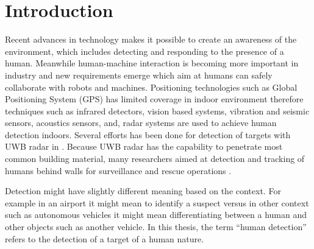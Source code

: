 \chapter{Introduction}
\label{Introduction}
Recent advances in technology makes it possible to create an awareness of the environment, which includes detecting and responding to the presence of a human. Meanwhile human-machine interaction is becoming more important in industry and new requirements emerge which aim at humans can safely collaborate with robots and machines. Positioning technologies such as Global Positioning System (GPS) has limited coverage in indoor environment therefore techniques such as infrared detectors, vision based systems, vibration and seismic sensors, acoustics sensors, and, radar systems are used to achieve human detection indoors. 
Several efforts has been done for detection of targets with UWB radar in \cite{ChangMHTC,Kilic2013,Shingu2008,Sachs2008}. Because UWB radar has the capability to penetrate most common building material, many researchers aimed at detection and tracking of humans behind walls for surveillance and rescue operations \cite{RaneMovintargetUWB,Zetik,Nezirovic2010, Rovnakova2013,ZhaoHMM}. 

Detection might have slightly different meaning based on the context. For example in an airport it might mean to identify a suspect versus in other context such as autonomous vehicles it might mean differentiating between a human and other objects such as another vehicle. In this thesis, the term “human detection” refers to the detection of a target of a human nature.


